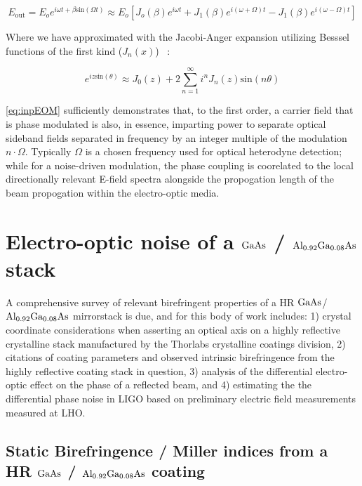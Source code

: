 \begin{equation}\label{eq:inpEOM}
	E_\mathrm{out} = E_o e^{i \omega t + \beta \mathrm{sin}( \Omega t)} \approx E_o [J_o(\beta)e^{i \omega t} + J_1(\beta) e^{i(\omega + \Omega)t} - J_1(\beta) e^{i(\omega - \Omega)t}]  
\end{equation}

\noindent Where we have approximated with the Jacobi-Anger expansion utilizing Besssel functions of the first kind ($J_n(x)$) ~\cite{oliver:1972}:

\begin{equation}\label{eq:jacobianger}
	e^{iz \mathrm{sin}(\theta)} \approx J_0(z) + 2 \sum_{n=1}^{\infty} i^n J_n(z) \mathrm{sin} (n \theta)
\end{equation}

\ref{eq:inpEOM} sufficiently demonstrates that, to the first order, a carrier field that is phase modulated is also, in essence, imparting power to separate optical sideband fields separated in frequency by an integer multiple of the modulation $n \cdot \Omega$. Typically $\Omega$ is a chosen frequency used for optical heterodyne detection; while for a noise-driven modulation, the phase coupling is coorelated to the local directionally relevant E-field spectra alongside the propogation length of the beam propogation within the electro-optic media.

\section{Electro-optic noise of a \texorpdfstring{$\mathrm{GaAs}$}{gaas} / \texorpdfstring{$\mathrm{Al_{0.92}Ga_{0.08}As}$}{algaas} stack}
A comprehensive survey of relevant birefringent properties of a HR $\mathrm{GaAs}$/$\mathrm{Al_{0.92}Ga_{0.08}As}$ mirrorstack is due, and for this body of work includes: 1) crystal coordinate considerations when asserting an optical axis on a highly reflective crystalline stack manufactured by the Thorlabs crystalline coatings division, 2) citations of coating parameters and observed intrinsic birefringence from the highly reflective coating stack in question, 3) analysis of the differential electro-optic effect on the phase of a reflected beam, and 4) estimating the the differential phase noise in LIGO based on preliminary electric field measurements measured at LHO.

\subsection{Static Birefringence / Miller indices from a HR \texorpdfstring{$\mathrm{GaAs}$}{gaas} / \texorpdfstring{$\mathrm{Al_{0.92}Ga_{0.08}As}$}{algaas} coating}

